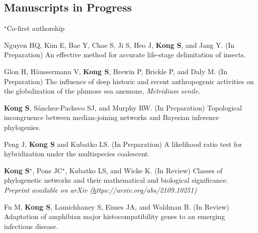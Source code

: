 \documentclass[11pt]{article}
\begin{document}
\subsection*{Manuscripts in Progress}
$^\star$Co-first authorship
\begin{etaremune}

	
	\item Nguyen HQ, Kim E, Bae Y, Chae S, Ji S,  Heo J, \textbf{Kong S}, and Jang Y. (In Preparation) An effective method for accurate life-stage delimitation of insects.
	\item Glon H, Häussermann V, \textbf{Kong S}, Brewin P, Brickle P, and Daly M. (In Preparation) The influence of deep historic and recent anthropogenic activities on the globalization of the plumose sea anemone, \textit{Metridium senile}.
	\item \textbf{Kong S}, Sánchez-Pacheco SJ, and Murphy RW. (In Preparation) Topological incongruence between median-joining networks and Bayesian inference phylogenies.
	\item Peng J, \textbf{Kong S} and Kubatko LS. (In Preparation) A likelihood ratio test for hybridization under the multispecies coalescent.
	
	\item \textbf{Kong S}$^\star$, Pons JC$^\star$, Kubatko LS, and Wicke K. (In Review) Classes of phylogenetic networks and their mathematical and biological significance. \textit{Preprint available on arXiv (\href{https://arxiv.org/abs/2109.10251}https://arxiv.org/abs/2109.10251)}
	\item Fu M, \textbf{Kong S}, Lamichhaney S, Eimes JA, and Waldman B. (In Review) Adaptation of amphibian major histocompatibility genes to an emerging infectious disease. 
\end{etaremune}

\pagebreak
\end{document}
